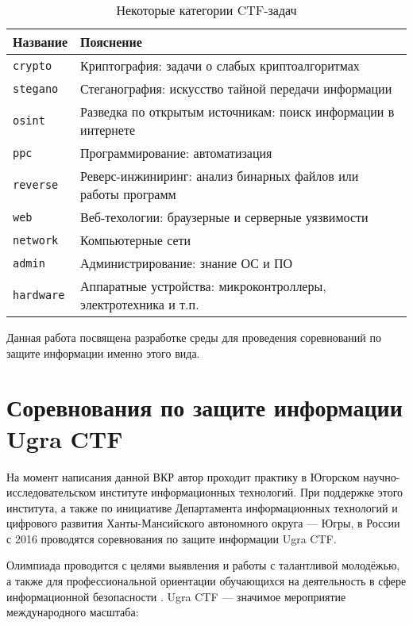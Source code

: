 \begin{center}
  \begin{longtable}{|p{}|p{}|}
    \caption{Некоторые категории CTF-задач}
    \label{tab:categories}
    \\ \hline
    Название & Пояснение
    \\ \hline \endhead
    \texttt{crypto}   & Криптография: задачи о слабых криптоалгоритмах \\
    \texttt{stegano}  & Стеганография: искусство тайной передачи информации \\
    \texttt{osint}    & Разведка по открытым источникам: поиск информации в интернете \\
    \texttt{ppc}      & Программирование: автоматизация \\
    \texttt{reverse}  & Реверс-инжиниринг: анализ бинарных файлов или работы программ \\
    \texttt{web}      & Веб-техологии: браузерные и серверные уязвимости \\
    \texttt{network}  & Компьютерные сети \\
    \texttt{admin}    & Администрирование: знание ОС и ПО \\
    \texttt{hardware} & Аппаратные устройства: микроконтроллеры, электротехника и т.п. \\
    \hline
  \end{longtable}
\end{center}


Данная работа посвящена разработке среды для проведения соревнований по защите информации именно этого вида.




\section{Соревнования по защите информации Ugra CTF}
\label{cha:analysis:ugractf}

На момент написания данной ВКР автор проходит практику в Югорском научно-исследовательском институте информационных технологий. При поддержке этого института, а также по инициативе Департамента информационных технологий и цифрового развития Ханты-Мансийского автономного округа — Югры, в России с 2016 проводятся соревнования по защите информации Ugra CTF.

Олимпиада проводится с целями выявления и работы с талантливой молодёжью, а также для профессиональной ориентации обучающихся на деятельность в сфере информационной безопасности \cite{Olymp}. Ugra CTF — значимое мероприятие международного масштаба:

